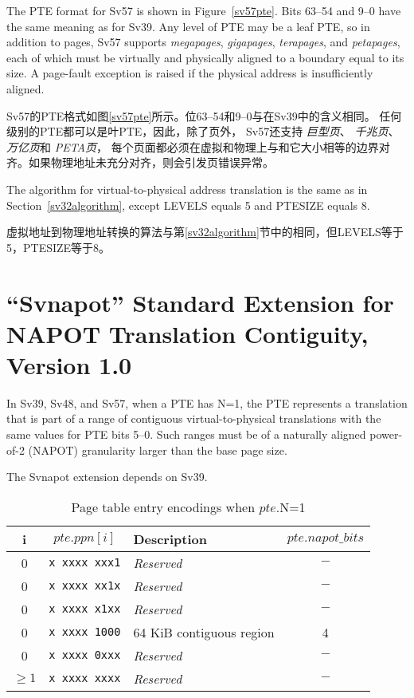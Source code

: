 The PTE format for Sv57 is shown in Figure~\ref{sv57pte}.  Bits 63--54 and 9--0
have the same meaning as for Sv39.  Any level of PTE may be a leaf
PTE, so in addition to  pages, Sv57 supports
 {\em megapages},  {\em gigapages},
 {\em terapages}, and  {\em petapages},
each of which must be virtually and physically aligned to a boundary equal
to its size.  A page-fault exception is raised if the physical address is
insufficiently aligned.

Sv57的PTE格式如图\ref{sv57pte}所示。位63--54和9--0与在Sv39中的含义相同。
任何级别的PTE都可以是叶PTE，因此，除了页外，
Sv57还支持 {\em 巨型页}、 {\em 千兆页}、
 {\em 万亿页}和 {\em PETA页}，
每个页面都必须在虚拟和物理上与和它大小相等的边界对齐。如果物理地址未充分对齐，则会引发页错误异常。

The algorithm for virtual-to-physical address translation is the same
as in Section~\ref{sv32algorithm}, except LEVELS equals 5 and PTESIZE
equals 8.

虚拟地址到物理地址转换的算法与第\ref{sv32algorithm}节中的相同，但LEVELS等于5，PTESIZE等于8。

\chapter{``Svnapot'' Standard Extension for NAPOT Translation Contiguity, Version 1.0}
\label{svnapot}

In Sv39, Sv48, and Sv57, when a PTE has N=1, the PTE represents a
translation that is part of a range of contiguous virtual-to-physical
translations with the same values for PTE bits 5--0.  Such ranges must be of a
naturally aligned power-of-2 (NAPOT) granularity larger than the base page
size.

The Svnapot extension depends on Sv39.

\begin{table*}[h!]
\begin{center}
\begin{tabular}{|c|c||l|c|}
\hline
i        & $pte.ppn[i]$      & Description              & $pte.napot\_bits$ \\
\hline
0        & {\tt x~xxxx~xxx1} & {\em Reserved}           & $-$ \\
0        & {\tt x~xxxx~xx1x} & {\em Reserved}           & $-$ \\
0        & {\tt x~xxxx~x1xx} & {\em Reserved}           & $-$ \\
0        & {\tt x~xxxx~1000} & 64 KiB contiguous region & 4   \\
0        & {\tt x~xxxx~0xxx} & {\em Reserved}           & $-$ \\
$\geq 1$ & {\tt x~xxxx~xxxx} & {\em Reserved}           & $-$ \\
\hline
\end{tabular}
\end{center}
\caption{Page table entry encodings when $pte$.N=1}
\label{ptenapot}
\end{table*}


